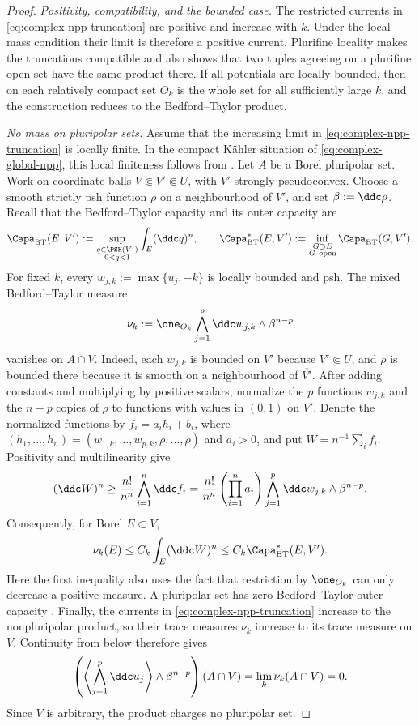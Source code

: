 \begin{proof}
\emph{Positivity, compatibility, and the bounded case.}
The restricted currents in \eqref{eq:complex-npp-truncation} are positive
and increase with $k$.  Under the local mass condition their limit is
therefore a positive current.  Plurifine locality makes the truncations
compatible and also shows that two tuples agreeing on a plurifine open set
have the same product there.  If all potentials are locally bounded, then
on each relatively compact set $O_k$ is the whole set for all sufficiently
large $k$, and the construction reduces to the Bedford--Taylor product.

\emph{No mass on pluripolar sets.}  Assume that the increasing limit in
\eqref{eq:complex-npp-truncation} is locally finite.  In the compact K\"ahler
situation of \eqref{eq:complex-global-npp}, this local finiteness follows from
\cite[Proposition~1.6]{BEGZ10}.  Let $A$ be a Borel pluripolar set.  Work
on coordinate balls $V\Subset V'\Subset U$, with $V'$ strongly
pseudoconvex.  Choose a smooth strictly psh function $\rho$ on a
neighbourhood of $\overline{V'}$, and set $\beta:=\ddc\rho$.  Recall
that the Bedford--Taylor capacity and its outer capacity are
\[
 \Capa_{\mathrm{BT}}(E,V')
 :=\sup_{\substack{q\in\PSH(V')\\0<q<1}}
       \int_E(\ddc q)^n,
 \qquad
 \Capa_{\mathrm{BT}}^*(E,V')
 :=\inf_{\substack{G\supset E\\G\ \mathrm{open}}}
       \Capa_{\mathrm{BT}}(G,V').
\]
For fixed $k$, every
$w_{j,k}:=\max\{u_j,-k\}$ is locally bounded and psh.  The mixed
Bedford--Taylor measure
\[
 \nu_k:=\one_{O_k}\bigwedge_{j=1}^p\ddc w_{j,k}
                   \wedge\beta^{n-p}
\]
vanishes on $A\cap V$.  Indeed, each $w_{j,k}$ is bounded on $V'$
because $\overline{V'}\Subset U$, and $\rho$ is bounded there because
it is smooth on a neighbourhood of $\overline{V'}$.  After adding
constants and multiplying by positive scalars, normalize the $p$ functions
$w_{j,k}$ and the $n-p$ copies of $\rho$ to functions with values in
$(0,1)$ on $V'$.  Denote the normalized functions by
$f_i=a_i h_i+b_i$, where
$(h_1,\ldots,h_n)=(w_{1,k},\ldots,w_{p,k},\rho,\ldots,\rho)$ and
$a_i>0$, and put $W=n^{-1}\sum_i f_i$.  Positivity and
multilinearity give
\[
 (\ddc W)^n\geq\frac{n!}{n^n}\bigwedge_{i=1}^n\ddc f_i
 =\frac{n!}{n^n}\left(\prod_{i=1}^na_i\right)
   \bigwedge_{j=1}^p\ddc w_{j,k}\wedge\beta^{n-p}.
\]
Consequently, for Borel $E\subset V$,
\[
 \nu_k(E)\leq C_k\int_E(\ddc W)^n
             \leq C_k\Capa_{\mathrm{BT}}^*(E,V').
\]
Here the first inequality also uses the fact that restriction by
$\one_{O_k}$ can only decrease a positive measure.  A pluripolar set has
zero Bedford--Taylor outer capacity
\cite[Theorem~6.9]{BT82}.  Finally, the currents in
\eqref{eq:complex-npp-truncation} increase to the nonpluripolar product, so
their trace measures $\nu_k$ increase to its trace measure on $V$.
Continuity from below therefore gives
\[
 \left(\left\langle\bigwedge_{j=1}^p\ddc u_j\right\rangle
       \wedge\beta^{n-p}\right)(A\cap V)
 =\lim_k\nu_k(A\cap V)=0.
\]
Since $V$ is arbitrary, the product charges no pluripolar set.


\end{proof}

